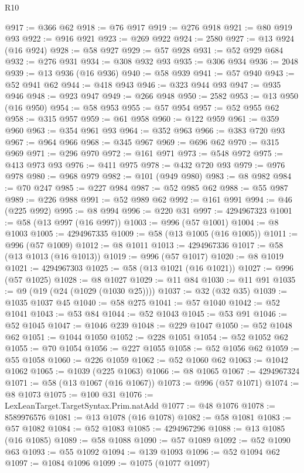 \begin{lexlean}{R10}
\begin{coremodule}
@917 := @366 @62
@918 := @76 @917
@919 := @276 @918
@921 := @80 @919 @93
@922 := @916 @921
@923 := @269 @922
@924 := 2580
@927 := @13 @924 (@16 @924)
@928 := @58 @927
@929 := @57 @928
@931 := @52 @929 @684
@932 := @276 @931
@934 := @308 @932 @93
@935 := @306 @934
@936 := 2048
@939 := @13 @936 (@16 @936)
@940 := @58 @939
@941 := @57 @940
@943 := @52 @941 @62
@944 := @418 @943
@946 := @323 @944 @93
@947 := @935 @946
@948 := @923 @947
@949 := @266 @948
@950 := 2582
@953 := @13 @950 (@16 @950)
@954 := @58 @953
@955 := @57 @954
@957 := @52 @955 @62
@958 := @315 @957
@959 := @61 @958
@960 := @122 @959
@961 := @359 @960
@963 := @354 @961 @93
@964 := @352 @963
@966 := @383 @720 @93
@967 := @964 @966
@968 := @345 @967
@969 := @696 @62
@970 := @315 @969
@971 := @296 @970
@972 := @161 @971
@973 := @548 @972
@975 := @413 @973 @93
@976 := @411 @975
@978 := @432 @720 @93
@979 := @976 @978
@980 := @968 @979
@982 := @101 (@949 @980)
@983 := @8 @982
@984 := @70 @247
@985 := @227 @984
@987 := @52 @985 @62
@988 := @55 @987
@989 := @226 @988
@991 := @52 @989 @62
@992 := @161 @991
@994 := @46 (@225 @992)
@995 := @8 @994
@996 := @220 @31
@997 := 4294967323
@1001 := @58 (@13 @997 (@16 @997))
@1003 := @996 (@57 @1001)
@1004 := @8 @1003
@1005 := 4294967335
@1009 := @58 (@13 @1005 (@16 @1005))
@1011 := @996 (@57 @1009)
@1012 := @8 @1011
@1013 := 4294967336
@1017 := @58 (@13 @1013 (@16 @1013))
@1019 := @996 (@57 @1017)
@1020 := @8 @1019
@1021 := 4294967303
@1025 := @58 (@13 @1021 (@16 @1021))
@1027 := @996 (@57 @1025)
@1028 := @8 @1027
@1029 := @11 @84
@1030 := @11 @91
@1035 := @9 (@19 (@24 (@1029 (@1030 @25))))
@1037 := @32 (@32 @35)
@1039 := @1035 @1037 @45
@1040 := @58 @275
@1041 := @57 @1040
@1042 := @52 @1041
@1043 := @53 @84
@1044 := @52 @1043
@1045 := @53 @91
@1046 := @52 @1045
@1047 := @1046 @239
@1048 := @229 @1047
@1050 := @52 @1048 @62
@1051 := @1044 @1050
@1052 := @228 @1051
@1054 := @52 @1052 @62
@1055 := @70 @1054
@1056 := @227 @1055
@1058 := @52 @1056 @62
@1059 := @55 @1058
@1060 := @226 @1059
@1062 := @52 @1060 @62
@1063 := @1042 @1062
@1065 := @1039 (@225 @1063)
@1066 := @8 @1065
@1067 := 4294967324
@1071 := @58 (@13 @1067 (@16 @1067))
@1073 := @996 (@57 @1071)
@1074 := @8 @1073
@1075 := @100 @31
@1076 := LexLeanTarget.TargetSyntax.Prim.natAdd
@1077 := @48 @1076
@1078 := 8589976576
@1081 := @13 @1078 (@16 @1078)
@1082 := @58 @1081
@1083 := @57 @1082
@1084 := @52 @1083
@1085 := 4294967296
@1088 := @13 @1085 (@16 @1085)
@1089 := @58 @1088
@1090 := @57 @1089
@1092 := @52 @1090 @63
@1093 := @55 @1092
@1094 := @139 @1093
@1096 := @52 @1094 @62
@1097 := @1084 @1096
@1099 := @1075 (@1077 @1097)

\end{coremodule}
\end{lexlean}

